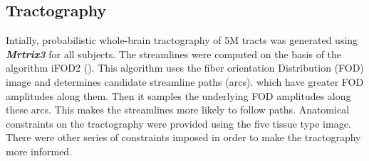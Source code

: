 \documentclass[msthesis.tex]{subfiles}
\begin{document}

\subsection{Tractography}

Intially, probabilistic  whole-brain tractography of 5M tracts was generated using \textbf{\textit{Mrtrix3}} for all subjects. The streamlines were computed on the basis of the algorithm iFOD2 (\cite{tournier2010improved}). This algorithm uses the fiber orientation Distribution (FOD) image and determines candidate streamline paths (arcs). which have greater FOD amplitudes along them. Then it samples the underlying FOD amplitudes along these arcs. This makes the streamlines more likely to follow paths. Anatomical constraints on the tractography were provided using the five tissue type image. There were other series of constraints imposed in order to make the  tractography more informed. 
\end{document}
